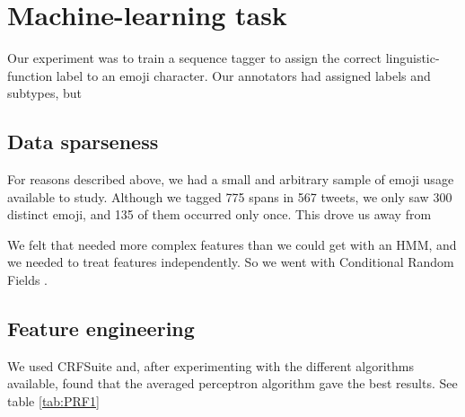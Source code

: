 \documentclass[11pt]{article}
\begin{document}
\section{Machine-learning task}

Our experiment was to train a sequence tagger to assign the correct linguistic-function label to an emoji character. Our annotators had
assigned labels and subtypes, but 

\subsection{Data sparseness}

For reasons described above, we had a small and arbitrary sample of emoji usage available to study. Although we tagged 775 spans in 567 tweets, we only saw 300 distinct emoji, and 135 of them occurred only once. This drove us away from

We felt that needed more complex features than we could get with an HMM, and we needed to treat features independently.
So we went with Conditional Random Fields \cite{CRFcite}.

\subsection{Feature engineering}

We used CRFSuite \cite{CRFSuite} and, after experimenting with the different algorithms available,
found that the averaged perceptron algorithm \cite{Collins:2002} gave the best results. See table \ref{tab:PRF1}
\end{document}
